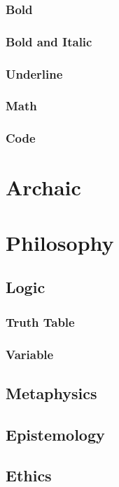 \documentclass{article}
\begin{document}
\subsubsection{Bold}
\subsubsection{Bold and Italic}
\subsubsection{Underline}
\subsubsection{Math}
\subsubsection{Code}

\section{Archaic}

\section{Philosophy}

\subsection{Logic}
\subsubsection{Truth Table}
\subsubsection{Variable}

\subsection{Metaphysics}

\subsection{Epistemology}

\subsection{Ethics}
\end{document}
